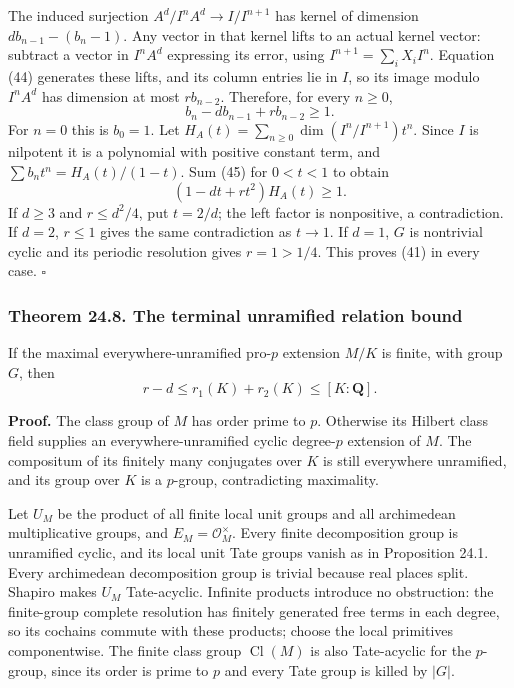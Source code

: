 \documentclass[11pt,a4paper]{article}
\begin{document}
The induced surjection \(A^d/I^nA^d\to I/I^{n+1}\) has kernel of
dimension \(d b_{n-1}-(b_n-1)\). Any vector in that kernel lifts to an
actual kernel vector: subtract a vector in \(I^nA^d\) expressing its
error, using \(I^{n+1}=\sum_i X_iI^n\). Equation (44) generates these
lifts, and its column entries lie in \(I\), so its image modulo
\(I^nA^d\) has dimension at most \(r b_{n-2}\). Therefore, for every
\(n\geq0\), \[
b_n-d b_{n-1}+r b_{n-2}\geq1.
\tag{45}
\] For \(n=0\) this is \(b_0=1\). Let
\(H_A(t)=\sum_{n\geq0}\dim(I^n/I^{n+1})t^n\). Since \(I\) is nilpotent
it is a polynomial with positive constant term, and
\(\sum b_nt^n=H_A(t)/(1-t)\). Sum (45) for \(0<t<1\) to obtain \[
(1-dt+rt^2)H_A(t)\geq1.
\tag{46}
\] If \(d\geq3\) and \(r\leq d^2/4\), put \(t=2/d\); the left factor is
nonpositive, a contradiction. If \(d=2\), \(r\leq1\) gives the same
contradiction as \(t\to1\). If \(d=1\), \(G\) is nontrivial cyclic and
its periodic resolution gives \(r=1>1/4\). This proves (41) in every
case. \(\square\)

\subsubsection{Theorem 24.8. The terminal unramified relation
bound}\label{theorem-24.8.-the-terminal-unramified-relation-bound}

If the maximal everywhere-unramified pro-\(p\) extension \(M/K\) is
finite, with group \(G\), then \[
r-d\leq r_1(K)+r_2(K)\leq[K:\mathbf Q].
\tag{47}
\]

\textbf{Proof.} The class group of \(M\) has order prime to \(p\).
Otherwise its Hilbert class field supplies an everywhere-unramified
cyclic degree-\(p\) extension of \(M\). The compositum of its finitely
many conjugates over \(K\) is still everywhere unramified, and its group
over \(K\) is a \(p\)-group, contradicting maximality.

Let \(U_M\) be the product of all finite local unit groups and all
archimedean multiplicative groups, and \(E_M=\mathcal O_M^\times\).
Every finite decomposition group is unramified cyclic, and its local
unit Tate groups vanish as in Proposition 24.1. Every archimedean
decomposition group is trivial because real places split. Shapiro makes
\(U_M\) Tate-acyclic. Infinite products introduce no obstruction: the
finite-group complete resolution has finitely generated free terms in
each degree, so its cochains commute with these products; choose the
local primitives componentwise. The finite class group
\(\operatorname{Cl}(M)\) is also Tate-acyclic for the \(p\)-group, since
its order is prime to \(p\) and every Tate group is killed by \(|G|\).
\end{document}

